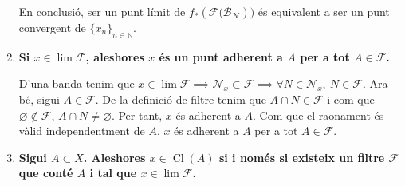 \documentclass[10pt,a4paper]{article}
\DeclareMathOperator{\Cl}{Cl} %
\begin{document}
\begin{enumerate}
            En conclusió, ser un punt límit de $f_*(\mathcal{F(B_N}))$ és equivalent a ser un punt convergent de $\{x_n\}_{n \in \mathbb N}$.

      \item\label{limit} \textbf{Si $x\in\lim\mathcal{F}$, aleshores $x$ és un punt adherent a $A$ per a tot $A\in\mathcal{F}$.}

            D'una banda tenim que $x\in\lim\mathcal{F}\implies \mathcal{N}_x\subset\mathcal{F}\implies\forall N\in \mathcal{N}_x,\ N\in\mathcal{F}$. Ara bé, sigui $A\in\mathcal{F}$. De la definició de filtre tenim que $A\cap N\in\mathcal{F}$ i com que $\varnothing\notin\mathcal{F}$, $A\cap N\ne\varnothing$. Per tant, $x$ és adherent a $A$. Com que el raonament és vàlid independentment de $A$, $x$ és adherent a $A$ per a tot $A\in\mathcal{F}$.
      \item \textbf{Sigui $A\subset X$.  Aleshores $x\in\Cl(A)$ si i només si existeix un filtre $\mathcal{F}$ que conté $A$ i tal que $x\in\lim\mathcal{F}$.}


\end{enumerate}
\end{document}
